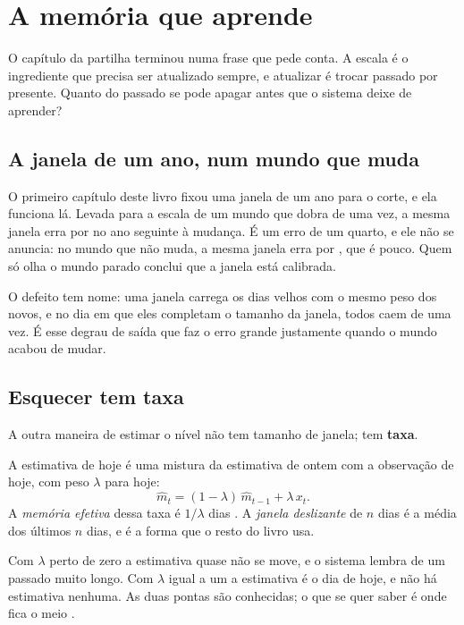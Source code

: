 \chapter{A memória que aprende}\label{cap:memoria}

O capítulo da partilha terminou numa frase que pede conta. A escala é o ingrediente que precisa ser
atualizado sempre, e atualizar é trocar passado por presente. Quanto do passado se pode apagar antes
que o sistema deixe de aprender?

\section{A janela de um ano, num mundo que muda}

O primeiro capítulo deste livro fixou uma janela de um ano para o corte, e ela funciona lá. Levada
para a escala de um mundo que dobra de uma vez, a mesma janela erra por \numEsquecimentoJanelaDuzentosECinquenta{}
no ano seguinte à mudança. É um erro de um quarto, e ele não se anuncia: no mundo que não muda, a
mesma janela erra por \numEsquecimentoPisoJanelaDuzentosECinquenta{}, que é pouco. Quem só olha o mundo
parado conclui que a janela está calibrada.

O defeito tem nome: uma janela carrega os dias velhos com o mesmo peso dos novos, e no dia em que
eles completam o tamanho da janela, todos caem de uma vez. É esse degrau de saída que faz o erro
grande justamente quando o mundo acabou de mudar.

\section{Esquecer tem taxa}

A outra maneira de estimar o nível não tem tamanho de janela; tem \textbf{taxa}.

\begin{definicao}\label{def:esquecimento}
A estimativa de hoje é uma mistura da estimativa de ontem com a observação de hoje, com peso
$\lambda$ para hoje:
\[
\hat m_t = (1-\lambda)\,\hat m_{t-1} + \lambda\, x_t .
\]
A \emph{memória efetiva} dessa taxa é $1/\lambda$ dias \cite{box2008time}. A \emph{janela deslizante} de $n$ dias é a
média dos últimos $n$ dias, e é a forma que o resto do livro usa.
\end{definicao}

Com $\lambda$ perto de zero a estimativa quase não se move, e o sistema lembra de um passado muito
longo. Com $\lambda$ igual a um a estimativa é o dia de hoje, e não há estimativa nenhuma. As duas
pontas são conhecidas; o que se quer saber é onde fica o meio \cite{dahlhaus1998optimal}.

